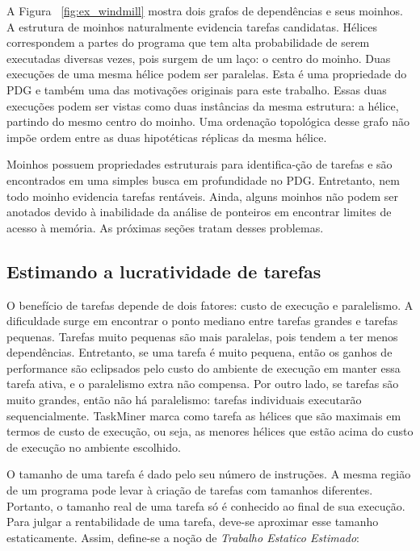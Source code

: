 \documentclass[sigplan,10pt]{acmart}
\newcommand\Taskminer{\mbox{\textsf{TaskMiner}}}
\begin{document}
A Figura ~\ref{fig:ex_windmill} mostra dois grafos de dependências e seus
moinhos. A estrutura de moinhos naturalmente evidencia tarefas candidatas.
Hélices correspondem a partes do programa que tem alta probabilidade de serem
executadas diversas vezes, pois surgem de um laço: o centro do moinho. Duas execuções
de uma mesma hélice podem ser paralelas. Esta é uma propriedade do PDG e também uma 
das motivações originais para este trabalho. Essas duas execuções podem ser vistas como duas instâncias
da mesma estrutura: a hélice, partindo do mesmo centro do moinho. 
Uma ordenação topológica desse grafo não impõe
ordem entre as duas hipotéticas réplicas da mesma hélice.

Moinhos possuem propriedades estruturais para identifica-\c{c}\~{a}o de tarefas e são encontrados
em uma simples busca em profundidade no PDG. Entretanto, nem todo moinho
evidencia tarefas rentáveis. Ainda, alguns moinhos não podem ser anotados devido à inabilidade 
da análise de ponteiros em encontrar limites de acesso à memória. As próximas seções tratam desses
problemas.

\subsection{Estimando a lucratividade de tarefas}
\label{sub:profit}

O benefício de tarefas depende de dois fatores: custo de execução e paralelismo.
A dificuldade surge em encontrar o ponto mediano entre tarefas grandes e tarefas pequenas.
Tarefas muito pequenas são mais paralelas, pois tendem a ter menos dependências. 
Entretanto, se uma tarefa é muito pequena, 
então os ganhos de performance são eclipsados pelo custo do ambiente de execução
em manter essa tarefa ativa, e o paralelismo extra não compensa.
Por outro lado, se tarefas são muito grandes, então não há paralelismo: 
tarefas individuais executarão sequencialmente.
{\Taskminer} marca como tarefa as hélices que são maximais 
em termos de custo de execução, ou seja, as menores hélices
que estão acima do custo de execução no ambiente escolhido.

O tamanho de uma tarefa é dado pelo seu número de instruções. A mesma região de um programa
pode levar à criação de tarefas com tamanhos diferentes. 
Portanto, o tamanho real de uma tarefa só é conhecido ao final 
de sua execução. Para julgar a rentabilidade de uma tarefa,
deve-se aproximar esse tamanho
estaticamente. Assim, define-se a noção de {\em Trabalho Estatico Estimado}:
\end{document}
